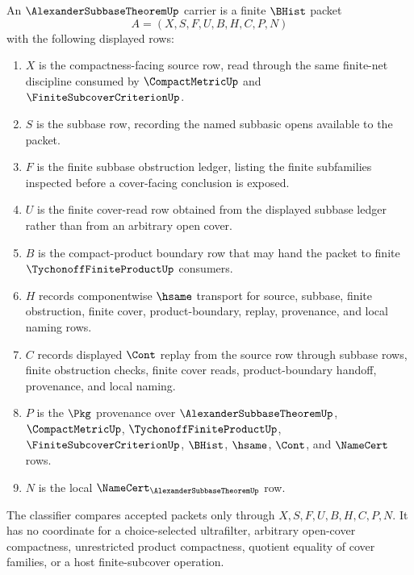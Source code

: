 \begin{definition}
\label{def:alexander-subbase-carrier}
An $\AlexanderSubbaseTheoremUp$ carrier is a finite $\BHist$ packet
$$
A=(X,S,F,U,B,H,C,P,N)
$$
with the following displayed rows:
\begin{enumerate}
\item $X$ is the compactness-facing source row, read through the same finite-net discipline consumed by $\CompactMetricUp$ and $\FiniteSubcoverCriterionUp$.
\item $S$ is the subbase row, recording the named subbasic opens available to the packet.
\item $F$ is the finite subbase obstruction ledger, listing the finite subfamilies inspected before a cover-facing conclusion is exposed.
\item $U$ is the finite cover-read row obtained from the displayed subbase ledger rather than from an arbitrary open cover.
\item $B$ is the compact-product boundary row that may hand the packet to finite $\TychonoffFiniteProductUp$ consumers.
\item $H$ records componentwise $\hsame$ transport for source, subbase, finite obstruction, finite cover, product-boundary, replay, provenance, and local naming rows.
\item $C$ records displayed $\Cont$ replay from the source row through subbase rows, finite obstruction checks, finite cover reads, product-boundary handoff, provenance, and local naming.
\item $P$ is the $\Pkg$ provenance over $\AlexanderSubbaseTheoremUp$, $\CompactMetricUp$, $\TychonoffFiniteProductUp$, $\FiniteSubcoverCriterionUp$, $\BHist$, $\hsame$, $\Cont$, and $\NameCert$ rows.
\item $N$ is the local $\NameCert_{\AlexanderSubbaseTheoremUp}$ row.
\end{enumerate}
The classifier compares accepted packets only through $X,S,F,U,B,H,C,P,N$. It has no coordinate for a choice-selected ultrafilter, arbitrary open-cover compactness, unrestricted product compactness, quotient equality of cover families, or a host finite-subcover operation.
\end{definition}

